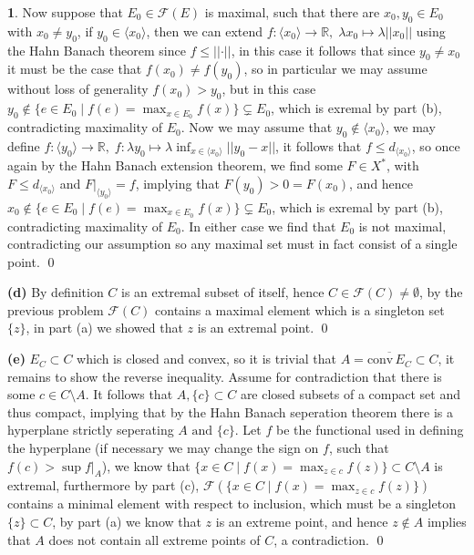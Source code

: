 \documentclass[10.5pt]{article}
\theoremstyle{definition}
\newtheorem{pb}{}
\newcommand{\set}[1]{\{#1\}}
\newcommand{\norm}[1]{\lvert\lvert#1\rvert\rvert}
\newcommand{\tand}{\text{ and }}
\newcommand{\gen}[1]{\langle #1 \rangle}
\begin{document}
\begin{pb}
        Now suppose that \(E_0 \in \mathcal{F}(E)\) is maximal, such that there are \(x_0,y_0 \in E_0\) with \(x_0 \neq y_0\), if \(y_0 \in \gen{x_0}\), then we can extend \(f: \gen{x_0} \to \mathbb{R}, \; \lambda x_0 \mapsto \lambda\norm{x_0}\) using the Hahn Banach theorem since \(f \leq \norm{\cdot}\), in this case it follows that since \(y_0 \neq x_0\) it must be the case that \(f(x_0) \neq f(y_0)\), so in particular we may assume without loss of generality \(f(x_0) > y_0\), but in this case \(y_0 \not \in \set{e \in E_0 \mid f(e) = \max_{x \in E_0}f(x)} \subsetneq E_0\), which is exremal by part (b), contradicting maximality of \(E_0\). Now we may assume that \(y_0 \not \in \gen{x_0}\), we may define \(f: \gen{y_0} \to \mathbb{R}, \; f: \lambda y_0 \mapsto \lambda\inf_{x \in \gen{x_0}}\norm{y_0 - x}\), it follows that \(f \leq d_{\gen{x_0}}\), so once again by the Hahn Banach extension theorem, we find some \(F \in X^*\), with \(F \leq d_{\gen{x_0}}\) and \(F \vert_{\gen{y_0}} = f\), implying that \(F(y_0) > 0 = F(x_0)\), and hence \(x_0 \not \in \set{e \in E_0 \mid f(e) = \max_{x \in E_0}f(x)} \subsetneq E_0\), which is exremal by part (b), contradicting maximality of \(E_0\). In either case we find that \(E_0\) is not maximal, contradicting our assumption so any maximal set must in fact consist of a single point. \qed

        \textbf{(d)} By definition \(C\) is an extremal subset of itself, hence \(C \in \mathcal{F}(C) \neq \emptyset\), by the previous problem \(\mathcal{F}(C)\) contains a maximal element which is a singleton set \(\set{z}\), in part (a) we showed that \(z\) is an extremal point. \qed

        \textbf{(e)} \(E_C \subset C\) which is closed and convex, so it is trivial that \(A = \overline{\text{conv}\,E_C} \subset C\), it remains to show the reverse inequality. Assume for contradiction that there is some \(c \in C \setminus A\). It follows that \(A, \set{c} \subset C\) are closed subsets of a compact set and thus compact, implying that by the Hahn Banach seperation theorem there is a hyperplane strictly seperating \(A \tand \set{c}\). Let \(f\) be the functional used in defining the hyperplane (if necessary we may change the sign on \(f\), such that \(f(c) > \sup f\vert_A\)), we know that \(\set{x \in C \mid f(x) = \max_{z \in c}f(z)} \subset C \setminus A\) is extremal, furthermore by part (c), \(\mathcal{F}(\set{x \in C \mid f(x) = \max_{z \in c}f(z)})\) contains a minimal element with respect to inclusion, which must be a singleton \(\set{z} \subset C\), by part (a) we know that \(z\) is an extreme point, and hence \(z \not \in A\) implies that \(A\) does not contain all extreme points of \(C\), a contradiction. \qed
    \end{pb}
\end{document}
